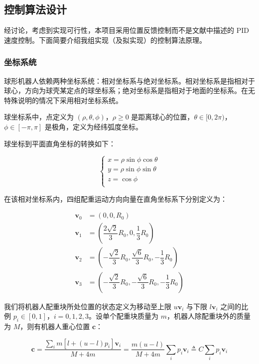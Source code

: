 \documentclass[a4paper]{ctexart}
\numberwithin{equation}{section}
\numberwithin{table}{section}
\numberwithin{figure}{section}
\begin{document}
\subsection{控制算法设计}

经讨论，考虑到实现可行性，本项目采用位置反馈控制而不是文献中描述的 PID 速度控制。下面简要介绍我组实现（及拟实现）的控制算法原理。

\subsubsection{坐标系统}

球形机器人依赖两种坐标系统：相对坐标系与绝对坐标系。相对坐标系是指相对于球心，方向为球壳某定点的球坐标系；绝对坐标系是指相对于地面的坐标系。在无特殊说明的情况下采用相对坐标系统。

球坐标系中，点定义为 $(\rho, \theta, \phi)$，$\rho\ge 0$ 是距离球心的位置，$\theta \in [0,2\pi)$，$\phi \in [-\pi, \pi]$ 是极角，定义为经纬弧度坐标。

球坐标到平面直角坐标的转换如下：

\begin{equation}
\begin{cases}
  x = \rho\sin\phi\cos\theta \\
  y = \rho\sin\phi\sin\theta \\
  z = \cos\phi \\
\end{cases}
\end{equation}

在该相对坐标系内，四组配重运动方向向量在直角坐标系下分别定义为：

\begin{align}
  \boldsymbol v_0 & = (0,0,R_0) \\
  \boldsymbol v_1 & = (\dfrac{2\sqrt{2}}{3}R_0,0,\dfrac{1}{3}R_0) \\
  \boldsymbol v_2 & = (-\dfrac{\sqrt{2}}{3}R_0,\dfrac{\sqrt{6}}{3}R_0,-\dfrac{1}{3}R_0) \\
  \boldsymbol v_3 & = (-\dfrac{\sqrt{2}}{3}R_0,-\dfrac{\sqrt{6}}{3}R_0,-\dfrac{1}{3}R_0)
\end{align}

我们将机器人配重块所处位置的状态定义为移动至上限 $u\boldsymbol v_i$ 与下限 $l\boldsymbol v_i$ 之间的比例 $p_i\in[0,1]$，$i = 0,1,2,3$。设单个配重块质量为 $m$，机器人除配重块外的质量为 $M$，则有机器人重心位置 $\boldsymbol c$：

\begin{equation}
  \boldsymbol c = \frac{\sum_i m [l + (u-l) p_i] \boldsymbol v_i}{M + 4m} = \frac{m (u-l)}{M + 4m}\sum_i p_i \boldsymbol v_i \triangleq C \sum_i p_i \boldsymbol v_i
  \label{equ_center}
\end{equation}
\end{document}
